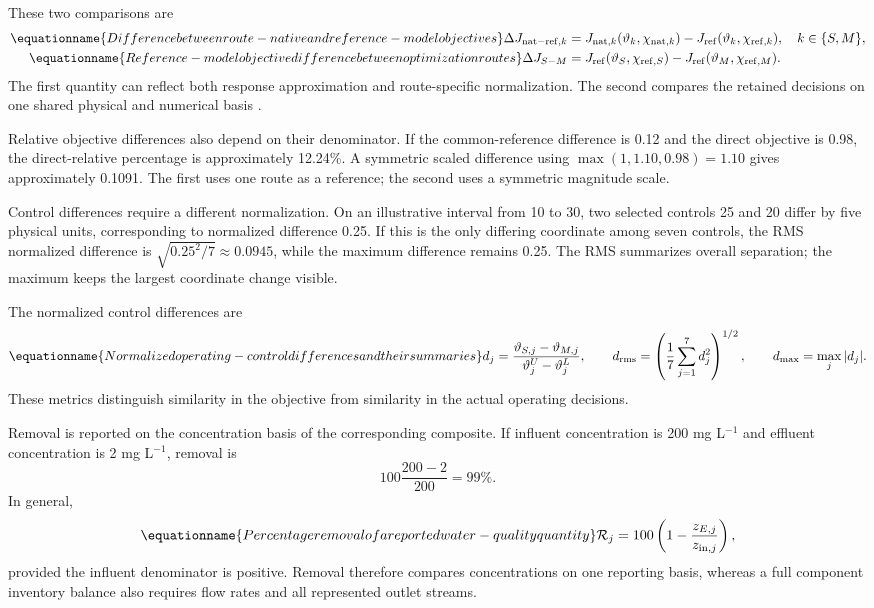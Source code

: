 These two comparisons are
\begin{align}
\equationname{Difference between route-native and reference-model objectives}
\Delta J_{{\rm nat-ref},k}&=
J_{{\rm nat},k}(\vartheta_k,\chi_{{\rm nat},k})
-J_{\rm ref}(\vartheta_k,\chi_{{\rm ref},k}),\quad k\in\{S,M\},\\
\equationname{Reference-model objective difference between optimization routes}
\Delta J_{S-M}&=J_{\rm ref}(\vartheta_S,\chi_{{\rm ref},S})
-J_{\rm ref}(\vartheta_M,\chi_{{\rm ref},M}).
\label{eq:plant_objective_comparison}
\end{align}
The first quantity can reflect both response approximation and route-specific normalization. The second compares the retained decisions on one shared physical and numerical basis \citep{BhosekarIerapetritou2018,Pedrozo2025}.

Relative objective differences also depend on their denominator. If the common-reference difference is 0.12 and the direct objective is 0.98, the direct-relative percentage is approximately 12.24\%. A symmetric scaled difference using $\max(1,1.10,0.98)=1.10$ gives approximately 0.1091. The first uses one route as a reference; the second uses a symmetric magnitude scale.

Control differences require a different normalization. On an illustrative interval from 10 to 30, two selected controls 25 and 20 differ by five physical units, corresponding to normalized difference 0.25. If this is the only differing coordinate among seven controls, the RMS normalized difference is $\sqrt{0.25^2/7}\approx0.0945$, while the maximum difference remains 0.25. The RMS summarizes overall separation; the maximum keeps the largest coordinate change visible.

The normalized control differences are
\begin{equation}
\equationname{Normalized operating-control differences and their summaries}
d_j=\frac{\vartheta_{S,j}-\vartheta_{M,j}}{\vartheta_j^U-\vartheta_j^L},\qquad
d_{\rm rms}=\left(\frac17\sum_{j=1}^7d_j^2\right)^{1/2},\qquad
d_{\max}=\max_j|d_j|.
\end{equation}
These metrics distinguish similarity in the objective from similarity in the actual operating decisions.

Removal is reported on the concentration basis of the corresponding composite. If influent concentration is 200 mg L$^{-1}$ and effluent concentration is 2 mg L$^{-1}$, removal is
\[
100\frac{200-2}{200}=99\%.
\]
In general,
\begin{equation}
\equationname{Percentage removal of a reported water-quality quantity}
\mathcal R_j=100\left(1-\frac{z_{E,j}}{z_{{\rm in},j}}\right),
\end{equation}
provided the influent denominator is positive. Removal therefore compares concentrations on one reporting basis, whereas a full component inventory balance also requires flow rates and all represented outlet streams.

